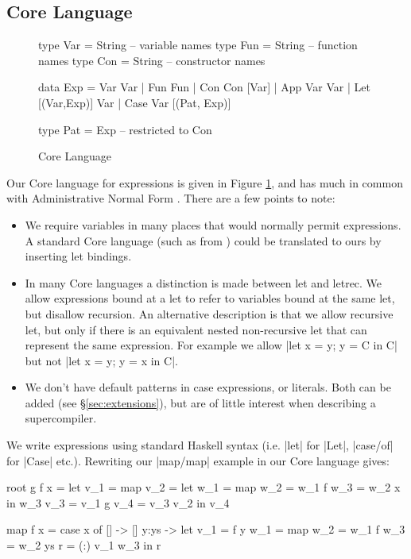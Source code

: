 \documentclass{sigplanconf}
\begin{document}
\subsection{Core Language}
\label{sec:core}

\begin{figure}
\begin{code}
type Var  = String -- variable names
type Fun  = String -- function names
type Con  = String -- constructor names

data Exp  =  Var Var
          |  Fun Fun
          |  Con Con [Var]
          |  App Var Var
          |  Let [(Var,Exp)] Var
          |  Case Var [(Pat, Exp)]

type Pat = Exp -- restricted to Con
\end{code}
\caption{Core Language}
\label{fig:core}
\end{figure}

Our Core language for expressions is given in Figure \ref{fig:core}, and has much in common with Administrative Normal Form \cite{flanagan:continuations}. There are a few points to note:

\begin{itemize}
\item We require variables in many places that would normally permit expressions. A standard Core language (such as from \citet{ghc_core}) could be translated to ours by inserting let bindings.
\item In many Core languages a distinction is made between let and letrec. We allow expressions bound at a let to refer to variables bound at the same let, but disallow recursion. An alternative description is that we allow recursive let, but only if there is an equivalent nested non-recursive let that can represent the same expression. For example we allow |let x = y; y = C in C| but not |let x = y; y = x in C|.
\item We don't have default patterns in case expressions, or literals. Both can be added (see \S\ref{sec:extensions}), but are of little interest when describing a supercompiler.
\end{itemize}

We write expressions using standard Haskell syntax (i.e. |let| for |Let|, |case/of| for |Case| etc.). Rewriting our |map/map| example in our Core language gives:

\begin{code}
root g f x =  let  v_1 =  map
                   v_2 =  let  w_1 = map
                               w_2 = w_1 f
                               w_3 = w_2 x
                          in   w_3
                   v_3 =  v_1 g
                   v_4 =  v_3 v_2
              in   v_4

map f x = case x of
    [] -> []
    y:ys -> let  v_1 = f y
                 w_1 = map
                 w_2 = w_1 f
                 w_3 = w_2 ys
                 r = (:) v_1 w_3
            in   r
\end{code}
\end{document}
